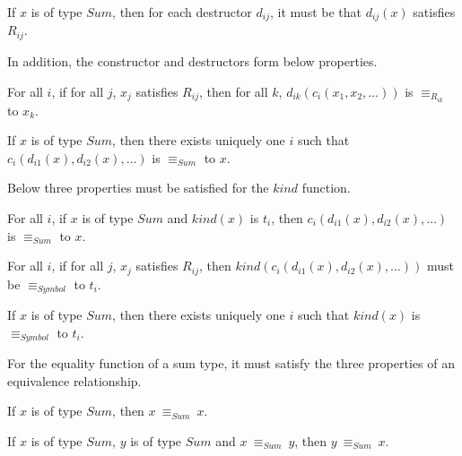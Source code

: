 \begin{property}
  If $x$ is of type $Sum$, then for each destructor $d_{ij}$, it must be that
  $d_{ij}(x)$ satisfies $R_{ij}$.
\end{property}

\noindent In addition, the constructor and destructors form below properties.

\begin{property}
  For all $i$, if for all $j$, $x_j$ satisfies $R_{ij}$, then for all $k$,
  $d_{ik}(c_i(x_1, x_2, \ldots))$ is $\equiv_{R_{ik}}$ to $x_k$.
\end{property}

\begin{property}
  If $x$ is of type $Sum$, then there exists uniquely one $i$ such that
  $c_i(d_{i1}(x), d_{i2}(x), \ldots)$ is $\equiv_{Sum}$ to $x$.
\end{property}

\noindent Below three properties must be satisfied for the $kind$ function.
\begin{property}
  For all $i$, if $x$ is of type $Sum$ and $kind(x)$ is $t_i$, then
  $c_i(d_{i1}(x), d_{i2}(x), \ldots)$ is $\equiv_{Sum}$ to $x$.
\end{property}

\begin{property}
  For all $i$, if for all $j$, $x_j$ satisfies $R_{ij}$, then
  $kind(c_i(d_{i1}(x), d_{i2}(x), \ldots))$ must be $\equiv_{Symbol}$ to $t_{i}$.
\end{property}

\begin{property}
  If $x$ is of type $Sum$, then there exists uniquely one $i$ such that
  $kind(x)$ is $\equiv_{Symbol}$ to $t_i$.
\end{property}

\noindent For the equality function of a sum type, it must satisfy the three
properties of an equivalence relationship.

\begin{property}
  If $x$ is of type $Sum$, then $x\: \equiv_{Sum}\: x$.
\end{property}

\begin{property}
  If $x$ is of type $Sum$, $y$ is of type $Sum$ and $x\: \equiv_{Sum}\: y$, then
  $y\: \equiv_{Sum}\: x$. 
\end{property}


